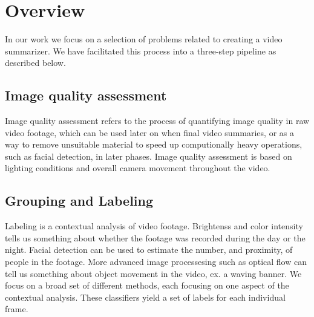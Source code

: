 \section{Overview}
%
In our work we focus on a selection of problems related to creating a video summarizer. We have facilitated this process into a three-step pipeline as described below.
%
\subsection{Image quality assessment}\label{sec:videoclipsegmentation}
%
Image quality assessment refers to the process of quantifying image quality in raw video footage, %
which can be used later on when final video summaries, or as a way to remove unsuitable material to speed up computionally heavy operations, such as facial detection, in later phases. %
Image quality assessment is based on lighting conditions and overall camera movement throughout the video.
%
\subsection{Grouping and Labeling}
%
Labeling is a contextual analysis of video footage. 
Brightenss and color intensity tells us something about whether the footage was recorded during the day or the night. Facial detection can be used to estimate the number, and proximity, of people in the footage. 
More advanced image processesing such as optical flow can tell us something about object movement in the video, ex. a waving banner. 
We focus on a broad set of different methods, each focusing on one aspect of the contextual analysis. These classifiers yield a set of labels for each individual frame.
%
